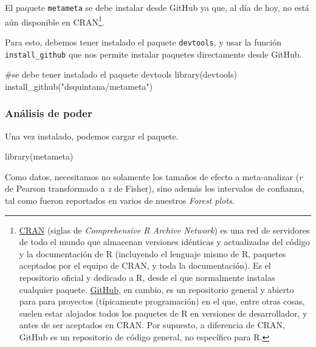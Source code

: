 \documentclass[
  bookmarksnumbered]{article}
\newenvironment{Shaded}{\begin{snugshade}}{\end{snugshade}}
\newcommand{\CommentTok}[1]{\textcolor[rgb]{0.54,0.53,0.53}{#1}}
\newcommand{\FunctionTok}[1]{\textcolor[rgb]{0.39,0.29,0.61}{#1}}
\newcommand{\NormalTok}[1]{\textcolor[rgb]{0.12,0.11,0.11}{#1}}
\newcommand{\StringTok}[1]{\textcolor[rgb]{0.75,0.01,0.01}{#1}}
\begin{document}
El paquete \texttt{metameta} se debe instalar desde GitHub ya que, al día de hoy, no está aún disponible en CRAN\footnote{\href{https://cran.r-project.org/}{CRAN} (siglas de \emph{Comprehensive R Archive Network}) es una red de servidores de todo el mundo que almacenan versiones idénticas y actualizadas del código y la documentación de R (incluyendo el lenguaje mismo de R, paquetes aceptados por el equipo de CRAN, y toda la documentación). Es el repositorio oficial y dedicado a R, desde el que normalmente instalas cualquier paquete. \href{https://github.com/}{GitHub}, en cambio, es un repositorio general y abierto para para proyectos (típicamente programación) en el que, entre otras cosas, suelen estar alojados todos los paquetes de R en versiones de desarrollador, y antes de ser aceptados en CRAN. Por supuesto, a diferencia de CRAN, GitHub es un repositorio de código general, no específico para R.}.

Para esto, debemos tener instalado el paquete \texttt{devtools}, y usar la función \texttt{install\_github} que nos permite instalar paquetes directamente desde GitHub.

\begin{Shaded}
\begin{Highlighting}[]
\CommentTok{\#se debe tener instalado el paquete devtools}
\FunctionTok{library}\NormalTok{(devtools)}
\FunctionTok{install\_github}\NormalTok{(}\StringTok{"dsquintana/metameta"}\NormalTok{)}
\end{Highlighting}
\end{Shaded}

\hypertarget{anuxe1lisis-de-poder}{%
\subsubsection{Análisis de poder}\label{anuxe1lisis-de-poder}}

Una vez instalado, podemos cargar el paquete.

\begin{Shaded}
\begin{Highlighting}[]
\FunctionTok{library}\NormalTok{(metameta)}
\end{Highlighting}
\end{Shaded}

Como datos, necesitamos no solamente los tamaños de efecto a meta-analizar (\(r\) de Pearson transformado a \emph{z} de Fisher), sino además los intervalos de confianza, tal como fueron reportados en varios de nuestros \emph{Forest plots}.
\end{document}
